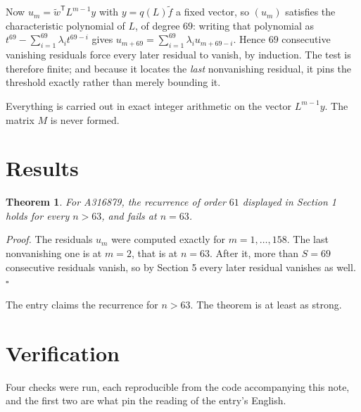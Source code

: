 \documentclass[11pt]{article}
\newtheorem{theorem}{Theorem}
\theoremstyle{definition}
\begin{document}
Now $u_m = \tilde w^{\mathsf T} L^{m-1} y$ with $y = q(L)\tilde f$ a fixed vector, so $(u_m)$ satisfies the characteristic polynomial of $L$, of degree $69$: writing that polynomial as $t^{69} - \sum_{i=1}^{69} \lambda_i t^{69-i}$ gives $u_{m+69} = \sum_{i=1}^{69} \lambda_i u_{m+69-i}$. Hence $69$ consecutive vanishing residuals force every later residual to vanish, by induction. The test is therefore finite; and because it locates the {\itshape last} nonvanishing residual, it pins the threshold exactly rather than merely bounding it.

Everything is carried out in exact integer arithmetic on the vector $L^{m-1}y$. The matrix $M$ is never formed.

\section{Results}

\begin{theorem} For A316879, the recurrence of order $61$ displayed in Section 1 holds for every $n > 63$, and fails at $n = 63$.\end{theorem}

{\itshape Proof.} The residuals $u_m$ were computed exactly for $m = 1,\dots,158$. The last nonvanishing one is at $m = 2$, that is at $n = 63$. After it, more than $S = 69$ consecutive residuals vanish, so by Section 5 every later residual vanishes as well. $\square$

The entry claims the recurrence for $n > 63$. The theorem is at least as strong.

\section{Verification}

Four checks were run, each reproducible from the code accompanying this note, and the first two are what pin the reading of the entry's English.
\end{document}
